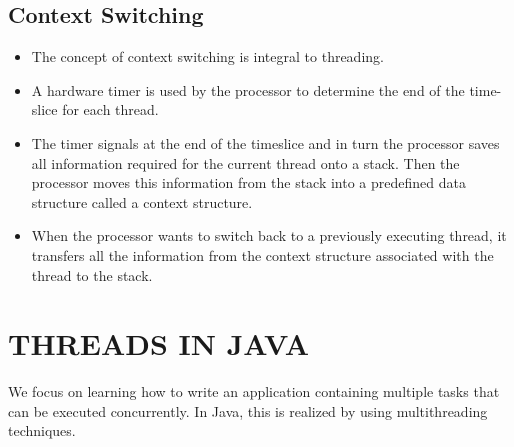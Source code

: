 \documentclass[12pt, a4paper]{book}
\begin{document}
\section{Context Switching}
\begin{itemize}
    \item The concept of context switching is integral to threading.
    \item A hardware timer is used by the processor to determine the end of the time-slice for each thread.
    \item The timer signals at the end of the timeslice and in turn the processor saves all information required for the current thread onto a stack. Then the processor moves this information from the stack into a predefined data structure called a context structure.
    \item When the processor wants to switch back to a previously executing thread, it transfers all the information from the context structure associated with the thread to the stack.
\end{itemize}

\chapter{THREADS IN JAVA}
We focus on learning how to write an application containing multiple tasks that can be executed concurrently. In Java, this is realized by using multithreading techniques.\\
\end{document}

